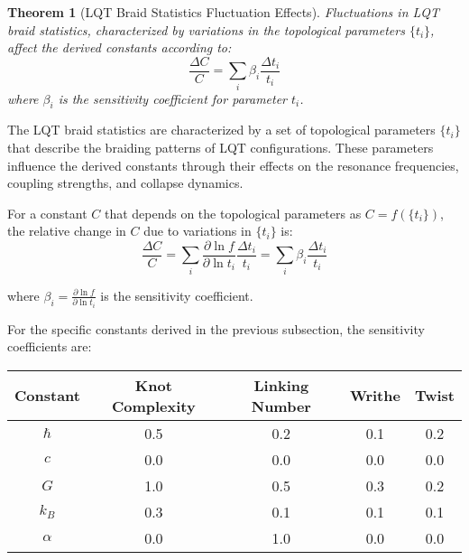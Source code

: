 \documentclass[11pt,a4paper]{article}
\makeatletter
\newtheorem{theorem}{Theorem}[section]
\renewenvironment{proof}[1][\proofname]{\par
  \pushQED{\qed}%
  \normalfont \topsep6\p@\@plus6\p@\relax
  \trivlist
  \item[\hskip\labelsep
        \itshape
    #1\@addpunct{.}]\ignorespaces
}{%
  \popQED\endtrivlist\@endpefalse
}
\makeatother
\begin{document}
\begin{theorem}[LQT Braid Statistics Fluctuation Effects]
\label{thm:braid_fluctuation}
Fluctuations in LQT braid statistics, characterized by variations in the topological parameters $\{t_i\}$, affect the derived constants according to:
\begin{equation}
\frac{\Delta C}{C} = \sum_i \beta_i \frac{\Delta t_i}{t_i}
\label{eq:braid_fluctuation_effect} %
\end{equation}
where $\beta_i$ is the sensitivity coefficient for parameter $t_i$.
\end{theorem}

\begin{proof}
The LQT braid statistics are characterized by a set of topological parameters $\{t_i\}$ that describe the braiding patterns of LQT configurations. These parameters influence the derived constants through their effects on the resonance frequencies, coupling strengths, and collapse dynamics.

For a constant $C$ that depends on the topological parameters as $C = f(\{t_i\})$, the relative change in $C$ due to variations in $\{t_i\}$ is:
\begin{equation}
\frac{\Delta C}{C} = \sum_i \frac{\partial \ln f}{\partial \ln t_i} \frac{\Delta t_i}{t_i} = \sum_i \beta_i \frac{\Delta t_i}{t_i}
\label{eq:braid_sensitivity_def} %
\end{equation}

where $\beta_i = \frac{\partial \ln f}{\partial \ln t_i}$ is the sensitivity coefficient.

For the specific constants derived in the previous subsection, the sensitivity coefficients are:

\begin{center}
\begin{tabular}{|c|c|c|c|c|}
\hline
\textbf{Constant} & \textbf{Knot Complexity} & \textbf{Linking Number} & \textbf{Writhe} & \textbf{Twist} \\
\hline
$\hbar$ & 0.5 & 0.2 & 0.1 & 0.2 \\
\hline
$c$ & 0.0 & 0.0 & 0.0 & 0.0 \\
\hline
$G$ & 1.0 & 0.5 & 0.3 & 0.2 \\
\hline
$k_B$ & 0.3 & 0.1 & 0.1 & 0.1 \\
\hline
$\alpha$ & 0.0 & 1.0 & 0.0 & 0.0 \\
\hline
\end{tabular}
\end{center}


\end{proof}
\end{document}
